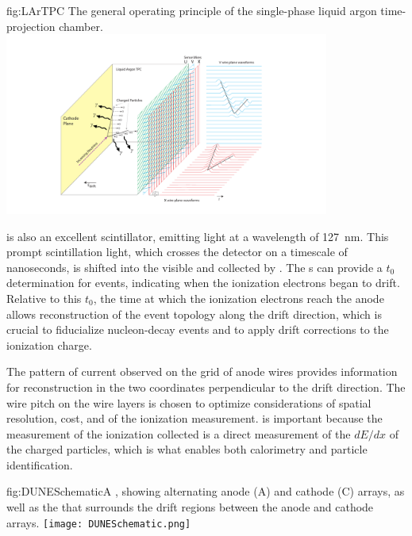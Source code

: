 \begin{dunefigure}{fig:LArTPC}
{The general operating principle of the single-phase liquid argon time-projection chamber.}
\includegraphics[trim={5cm 0 5cm 0},clip,width=0.8\textwidth]{graphics/TheBoPicture.pdf}
\end{dunefigure}

 is also an excellent scintillator, emitting  light at a wavelength of \SI{127}{\nano\meter}. This prompt scintillation light, which crosses the detector on a timescale of nanoseconds, is shifted into the visible and collected by . The s can provide a $t_{0}$ determination for events, indicating when the ionization electrons began to drift. Relative to this $t_{0}$, the time at which the ionization electrons reach the anode allows reconstruction of the event topology along the drift direction, which is crucial to fiducialize nucleon-decay events and to apply drift corrections to the ionization charge.

The pattern of current observed on the grid of anode wires provides information for reconstruction in the two coordinates perpendicular to the drift direction. The wire pitch on the wire layers is chosen to optimize considerations of  spatial resolution, cost, and  of the ionization measurement.  is important because the measurement of the ionization collected is a direct measurement of the $dE/dx$ of the charged particles, which is what enables both calorimetry and particle identification.


\begin{dunefigure}{fig:DUNESchematic}{A \nominalmodsize {}  , showing alternating anode (A) and cathode (C) arrays, as well as the  that surrounds the drift regions between the anode and cathode arrays.}
\texttt{[image: DUNESchematic.png]}
\end{dunefigure}

